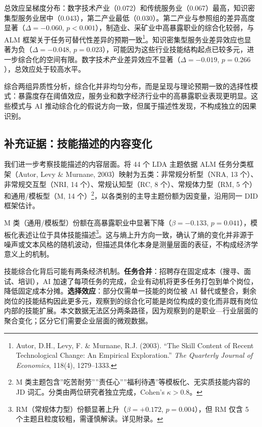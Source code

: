 \documentclass[12pt, a4paper]{article}
\begin{document}
总效应呈梯度分布：数字技术产业（0.072）和传统服务业（0.067）最高，知识密集型服务业居中（0.043），第二产业最低（0.030）。第二产业与参照组的差异高度显著（$\Delta = -0.060$, $p < 0.001$），制造业、采矿业中高暴露职业的综合化较弱，与 ALM 框架关于任务可替代性差异的预期一致\footnote{Autor, D.H., Levy, F. \& Murnane, R.J. (2003). ``The Skill Content of Recent Technological Change: An Empirical Exploration.'' \textit{The Quarterly Journal of Economics}, 118(4), 1279--1333.}。知识密集型服务业差异效应也显著为负（$\Delta = -0.048$, $p = 0.023$），可能因为这些行业技能结构起点已较多元，进一步综合化的空间有限。数字技术产业差异效应不显著（$\Delta = -0.019$, $p = 0.266$），总效应处于较高水平。

综合两组异质性分析，综合化并非均匀分布，而是呈现与理论预期一致的选择性模式：暴露度存在阈值效应，服务业和数字经济行业中的高暴露职业表现更明显。这些模式与 AI 推动综合化的假说方向一致，但属于描述性发现，不构成独立的因果识别。

\subsection{补充证据：技能描述的内容变化}

我们进一步考察技能描述的内容层面。将 44 个 LDA 主题依据 ALM 任务分类框架（Autor, Levy \& Murnane, 2003）映射为五类：非常规分析型（NRA, 13 个）、非常规交互型（NRI, 14 个）、常规认知型（RC, 8 个）、常规体力型（RM, 5 个）和通用/模板型（M, 14 个）\footnote{M 类主题包含”吃苦耐劳””责任心””福利待遇”等模板化、无实质技能内容的 JD 词汇。分类由两位研究者独立完成，Cohen's $\kappa > 0.8$。}，以各类别的主导主题份额为因变量，沿用同一 DID 框架估计。

M 类（通用/模板型）份额在高暴露职业中显著下降（$\beta = -0.133$, $p = 0.041$），模板化表述让位于具体技能描述\footnote{RM（常规体力型）份额显著上升（$\beta = +0.172$, $p = 0.004$），但 RM 仅含 5 个主题且粒度较粗，需谨慎解读。详见附录。}。这与熵上升方向一致，确认了熵的变化并非源于噪声或文本风格的随机波动，但描述具体化本身是测量层面的表征，不构成经济学意义上的机制。

技能综合化背后可能有两条经济机制。\textbf{任务合并}：招聘存在固定成本（搜寻、面试、培训），AI 加速了每项任务的完成，企业有动机将更多任务打包到单个岗位，降低固定成本分摊。\textbf{选择效应}：部分仅需单一技能的岗位被 AI 替代或整合，剩余岗位的技能结构因此更多元，观察到的综合化可能是岗位构成的变化而非既有岗位内部的技能扩展。本文数据无法区分两条路径，因为观察到的是职业—行业层面的聚合变化；区分它们需要企业层面的微观数据。
\end{document}
